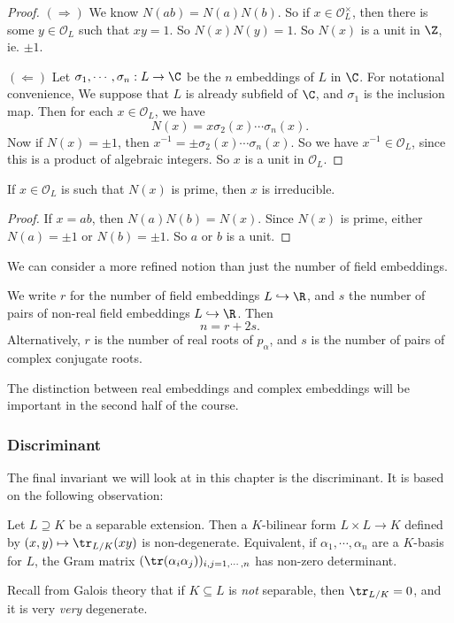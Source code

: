 \documentclass[a4paper]{article}
\begin{document}
\begin{proof}
  $(\Rightarrow)$ We know $N(a b) = N(a)N(b)$. So if $x \in \mathcal{O}_L^\times$, then there is some $y \in \mathcal{O}_L$ such that $xy = 1$. So $N(x) N(y) = 1$. So $N(x)$ is a unit in $\Z$, ie. $\pm 1$.

  $(\Leftarrow)$ Let $\sigma_1, \cdots, \sigma_n: L \to \C$ be the $n$ embeddings of $L$ in $\C$. For notational convenience, We suppose that $L$ is already subfield of $\C$, and $\sigma_1$ is the inclusion map. Then for each $x \in \mathcal{O}_L$, we have
  \[
    N(x) = x \sigma_2(x) \cdots \sigma_n(x).
  \]
  Now if $N(x) = \pm 1$, then $x^{-1} = \pm \sigma_2(x) \cdots \sigma_n(x)$. So we have $x^{-1} \in \mathcal{O}_L$, since this is a product of algebraic integers. So $x$ is a unit in $\mathcal{O}_L$.
\end{proof}

\begin{cor}
  If $x \in \mathcal{O}_L$ is such that $N(x)$ is prime, then $x$ is irreducible.
\end{cor}

\begin{proof}
  If $x = ab$, then $N(a)N(b) = N(x)$. Since $N(x)$ is prime, either $N(a) = \pm 1$ or $N(b) = \pm 1$. So $a$ or $b$ is a unit.
\end{proof}
We can consider a more refined notion than just the number of field embeddings.

\begin{defi}[$r$ and $s$]
  We write $r$ for the number of field embeddings $L \hookrightarrow \R$, and $s$ the number of pairs of non-real field embeddings $L \hookrightarrow \R$. Then
  \[
    n = r + 2s.
  \]
  Alternatively, $r$ is the number of real roots of $p_\alpha$, and $s$ is the number of pairs of complex conjugate roots.
\end{defi}
The distinction between real embeddings and complex embeddings will be important in the second half of the course.

\subsubsection*{Discriminant}
The final invariant we will look at in this chapter is the discriminant. It is based on the following observation:

\begin{prop}
  Let $L\supseteq K$ be a separable extension. Then a $K$-bilinear form $L \times L \to K$ defined by $(x, y) \mapsto \tr_{L/K}(xy)$ is non-degenerate. Equivalent, if $\alpha_1,\cdots, \alpha_n$ are a $K$-basis for $L$, the Gram matrix $(\tr(\alpha_i\alpha_j))_{i, j = 1, \cdots, n}$ has non-zero determinant.
\end{prop}
Recall from Galois theory that if $K \subseteq L$ is \emph{not} separable, then $\tr_{L/K} = 0$, and it is very \emph{very} degenerate.
\end{document}
